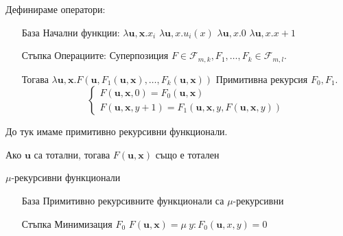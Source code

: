 \begin{definition}
    Дефинираме оператори:
    \begin{itemize}
        \item[База] Начални функции: 
            \subitem $\lambda \textbf{u},\textbf{x}. x_i$
            \subitem $\lambda \textbf{u}, x. u_i(x)$
            \subitem $\lambda \textbf{u}, x. 0$
            \subitem $\lambda \textbf{u}, x. x+1$
        \item[Стъпка] Операциите:
            \subitem Суперпозиция $F \in \mathcal F_{m,k}, F_1, \dots, F_k \in \mathcal F_{m,l}$.
            
            Тогава $\lambda \textbf{u}, \textbf{x}. F(\textbf{u}, F_1(\textbf{u}, \textbf{x}), \dots, F_k(\textbf{u}, \textbf{x}))$
            \subitem Примитивна рекурсия $F_0, F_1$. 
            \begin{equation*}
                \begin{cases}
                    F(\textbf{u}, \textbf{x}, 0) = F_0(\textbf{u}, \textbf{x}) \\
                    F(\textbf{u}, \textbf{x}, y+1) = F_1(\textbf{u}, \textbf{x}, y, F(\textbf{u}, \textbf{x}, y))
                \end{cases}
            \end{equation*}
    \end{itemize}
    До тук имаме примитивно рекурсивни функционали. 
    
    Ако $\textbf{u}$ са тотални, тогава $F(\textbf{u}, \textbf{x})$ също е тотален
\end{definition}

\begin{definition}
    $\mu$-рекурсивни функционали
    \begin{itemize}
        \item[База] Примитивно рекурсивните функционали са $\mu$-рекурсивни
        \item[Стъпка] Минимизация $F_0$
            \subitem $F(\textbf{u}, \textbf{x}) = \mu\ y: F_0(\textbf{u}, x, y) = 0$
    \end{itemize}
\end{definition}

